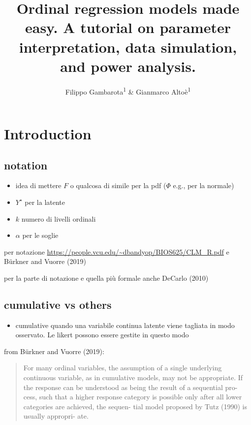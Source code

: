 \documentclass[
  man,floatsintext]{apa6}
\title{Ordinal regression models made easy. A tutorial on parameter interpretation, data simulation, and power analysis.}
\author{Filippo Gambarota\textsuperscript{1} \& Gianmarco Altoè\textsuperscript{1}}
\date{}
\affiliation{\vspace{0.5cm}\textsuperscript{1} Department of Developmental Psychology and Socialization, University of Padova, Italy}
\providecommand{\tightlist}{%
  \setlength{\itemsep}{0pt}\setlength{\parskip}{0pt}}
\begin{document}
\maketitle

\section{Introduction}\label{introduction}

\subsection{notation}\label{notation}

\begin{itemize}
\tightlist
\item
  idea di mettere \(F\) o qualcosa di simile per la pdf (\(\Phi\) e.g., per la normale)
\item
  \(Y^\star\) per la latente
\item
  \(k\) numero di livelli ordinali
\item
  \(\alpha\) per le soglie
\end{itemize}

per notazione \url{https://people.vcu.edu/~dbandyop/BIOS625/CLM_R.pdf} e Bürkner and Vuorre (2019)

per la parte di notazione e quella più formale anche DeCarlo (2010)

\subsection{cumulative vs others}\label{cumulative-vs-others}

\begin{itemize}
\tightlist
\item
  cumulative quando una variabile continua latente viene tagliata in modo osservato. Le likert possono essere gestite in questo modo
\end{itemize}

from Bürkner and Vuorre (2019):

\begin{quote}
For many ordinal variables, the assumption of a single underlying continuous variable, as in cumulative models, may not be appropriate. If the response can be understood as being the result of a sequential pro- cess, such that a higher response category is possible only after all lower categories are achieved, the sequen- tial model proposed by Tutz (1990) is usually appropri- ate.
\end{quote}
\end{document}
